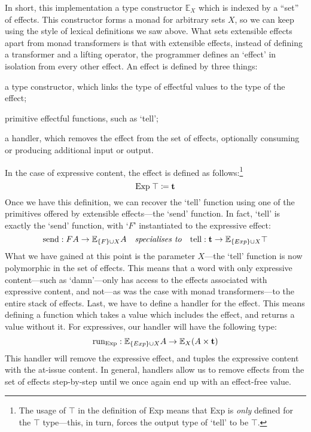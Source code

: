 In short, this implementation a type constructor $\mathbb{E}_X$ which
is indexed by a ``set'' of effects. This constructor forms a monad for
arbitrary sets $X$, so we can keep using the style of lexical
definitions we saw above.
What sets extensible effects apart from monad transformers is that
with extensible effects, instead of defining a transformer and a
lifting operator, the programmer defines an `effect' in isolation from
every other effect. An effect is defined by three things:
\begin{enumerate*}[label=\arabic*)]
\item a type constructor, which links the type of effectful values to
  the type of the effect;
\item primitive effectful functions, such as `tell';
\item a handler, which removes the effect from the set of effects,
  optionally consuming or producing additional input or output.
\end{enumerate*}
In the case of expressive content, the effect is
defined as follows:\footnote{%
  The usage of $\top$ in the definition of Exp means that Exp is
  \emph{only} defined for the $\top$ type---this, in turn, forces the
  output type of `tell' to be $\top$.
}
\[
  \text{Exp}\;\top\coloneqq\mathbf{t}
\]
Once we have this definition, we can recover the `tell' function using
one of the primitives offered by extensible effects---the `send'
function. In fact, `tell' is exactly the `send' function, with `$F$'
instantiated to the expressive effect:
\[
  \text{send} : FA\rightarrow\mathbb{E}_{\{F\}\cup X}A
  \quad
  \textit{specialises to}
  \quad
  \text{tell} : \mathbf{t}\rightarrow\mathbb{E}_{\{Exp\}\cup X}\top
\]
What we have gained at this point is the parameter $X$---the `tell'
function is now polymorphic in the set of effects. This means that a
word with only expressive content---such as `damn'---only has access
to the effects associated with expressive content, and not---as was
the case with monad transformers---to the entire stack of effects.
Last, we have to define a handler for the effect. This means defining
a function which takes a value which includes the effect, and returns
a value without it. For expressives, our handler will have the
following type:
\[
  \text{run}_{\text{Exp}} : \mathbb{E}_{\{Exp\}\cup X}A\rightarrow\mathbb{E}_{X}(A\times\mathbf{t})
\]
This handler will remove the expressive effect, and tuples the
expressive content with the at-issue content. In general, handlers
allow us to remove effects from the set of effects step-by-step until
we once again end up with an effect-free value.


